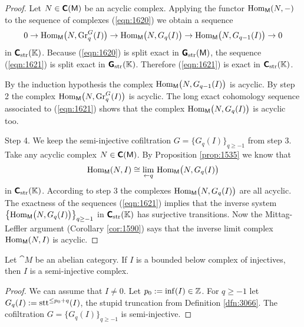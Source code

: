 \begin{proof}
Let $N \in \boldsymbol{\mathsf{C}}(\operatorname{\mathsf{M}})$ be an acyclic complex. Applying the 
functor $\operatorname{Hom}_{\operatorname{\mathsf{M}}}(N, -)$ 
to the sequence of complexes (\ref{eqn:1620}) we obtain a sequence 
\begin{equation} \label{eqn:1621}
0 \to \operatorname{Hom}_{\operatorname{\mathsf{M}}} \bigl( N, \operatorname{Gr}^G_{q}(I) \bigr) \to  
\operatorname{Hom}_{\operatorname{\mathsf{M}}} \bigl( N, G_q(I) \bigr) \to 
\operatorname{Hom}_{\operatorname{\mathsf{M}}} \bigl( N, G_{q - 1}(I) \bigr) \to  0
\end{equation}
in $\boldsymbol{\mathsf{C}}_{\mathrm{str}}(\mathbb{K})$. Because (\ref{eqn:1620}) is split exact in 
$\operatorname{\boldsymbol{\mathsf{G}}}_{\mathrm{str}}(\operatorname{\mathsf{M}})$, the sequence (\ref{eqn:1621}) is split exact 
in $\operatorname{\boldsymbol{\mathsf{G}}}_{\mathrm{str}}(\mathbb{K})$. Therefore (\ref{eqn:1621}) is exact in 
$\boldsymbol{\mathsf{C}}_{\mathrm{str}}(\mathbb{K})$.

By the induction hypothesis the complex 
$\operatorname{Hom}_{\operatorname{\mathsf{M}}} \bigl( N, G_{q - 1}(I) \bigr)$
is acyclic. By step 2 the complex
$\operatorname{Hom}_{\operatorname{\mathsf{M}}} \bigl( N, \operatorname{Gr}^G_{q}(I) \bigr)$
is acyclic. The long exact cohomology sequence associated to 
(\ref{eqn:1621}) shows that the complex 
$\operatorname{Hom}_{\operatorname{\mathsf{M}}} \bigl( N, G_{q}(I) \bigr)$
is acyclic too.

\medskip \noindent
Step 4. We keep the semi-injective cofiltration 
$G = \{ G_q(I) \}_{q \geq -1}$ from step 3. 
Take any acyclic complex $N \in \operatorname{\boldsymbol{\mathsf{C}}}(\operatorname{\mathsf{M}})$. By 
Proposition \ref{prop:1535} we know that 
\[ \operatorname{Hom}_{\operatorname{\mathsf{M}}}(N, I) \cong 
\lim_{\leftarrow q} \, \operatorname{Hom}_{\operatorname{\mathsf{M}}} 
\bigl( N, G_q(I) \bigr) \]
in $\boldsymbol{\mathsf{C}}_{\mathrm{str}}(\mathbb{K})$. According to step 3 the complexes 
$\operatorname{Hom}_{\operatorname{\mathsf{M}}} \bigl( N, G_q(I) \bigr)$ are all acyclic. 
The exactness of the sequences (\ref{eqn:1621}) implies that 
the inverse system \lb 
$\bigl\{ \operatorname{Hom}_{\operatorname{\mathsf{M}}} \bigl( N, G_q(I) \bigr) \bigr\}_{q \geq -1}$
in $\boldsymbol{\mathsf{C}}_{\mathrm{str}}(\mathbb{K})$ has surjective transitions. Now the 
Mittag-Leffler argument (Corollary \ref{cor:1590}) says that the inverse limit 
complex $\operatorname{Hom}_{\operatorname{\mathsf{M}}}(N, I)$ is acyclic. 
\end{proof}


\begin{prop} \label{prop:1635}
Let $\cat{M}$ be an abelian category. If $I$ is a bounded below complex of 
injectives, then $I$ is a semi-injective complex.
\end{prop}

\begin{proof}
We can assume that $I \neq 0$. Let 
$p_0 := \operatorname{inf}(I) \in \mathbb{Z}$. For $q \geq -1$ let 
$G_q(I) := \operatorname{stt}^{\leq p_0 + q}(I)$,
the stupid truncation from Definition \ref{dfn:3066}.
The cofiltration $G = \{ G_q(I) \}_{q \geq -1}$ is semi-injective. 
\end{proof}

